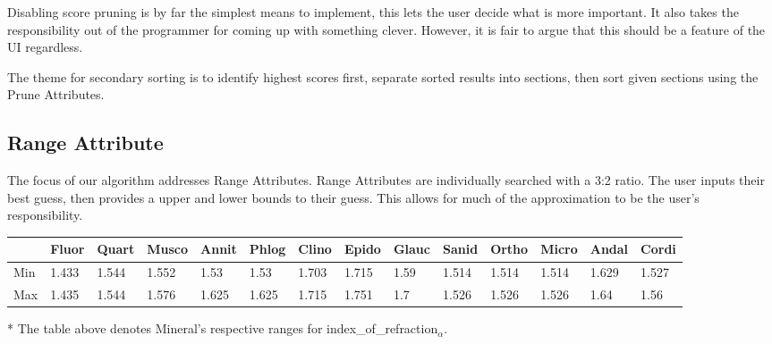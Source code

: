 \documentclass{article}
\def \RangeA{Range Attribute\xspace}
\def \PruneA{Prune Attribute\xspace}
\def \ira{index\_of\_refraction$_\alpha$\xspace}
\begin{document}
Disabling score pruning is by far the simplest means to implement, this lets the user decide what is more important. It also takes the responsibility out of the programmer for coming up with something clever. However, it is fair to argue that this should be a feature of the UI regardless.

The theme for secondary sorting is to identify highest scores first, separate sorted results into sections, then sort given sections using the \PruneA{}s.

\newpage
\subsection*{\RangeA}
The focus of our algorithm addresses \RangeA{}s. \RangeA{}s are individually searched with a 3:2 ratio. The user inputs their best guess, then provides a upper and lower bounds to their guess. This allows for much of the approximation to be the user's responsibility. 
\newline
\newline
\tiny

\begin{tabular}{l|l|l|l|l|l|l|l|l|l|l|l|l|l}
& Fluor & Quart & Musco & Annit & Phlog & Clino & Epido & Glauc & Sanid & Ortho & Micro & Andal & Cordi \\ 
\hline
Min & 1.433 & 1.544 & 1.552 & 1.53 & 1.53 & 1.703 & 1.715 & 1.59 & 1.514 & 1.514 & 1.514 & 1.629 & 1.527 \\ 
Max & 1.435 & 1.544 & 1.576 & 1.625 & 1.625 & 1.715 & 1.751 & 1.7 & 1.526 & 1.526 & 1.526 & 1.64 & 1.56 \\ 
\end{tabular}
\normalsize

*\linebreak
The table above denotes Mineral's respective ranges for \ira.
\end{document}
